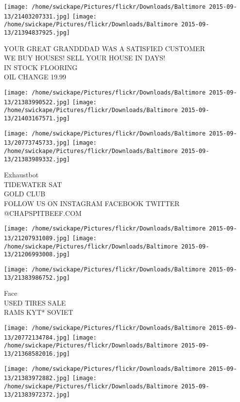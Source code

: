 \documentclass[10pt,letterpaper]{article}
\begin{document}
\texttt{[image: /home/swickape/Pictures/flickr/Downloads/Baltimore 2015-09-13/21403207331.jpg]}
\texttt{[image: /home/swickape/Pictures/flickr/Downloads/Baltimore 2015-09-13/21394837925.jpg]}

YOUR GREAT GRANDDDAD WAS A SATISFIED CUSTOMER\\
WE BUY HOUSES!  SELL YOUR HOUSE IN DAYS!\\
IN STOCK FLOORING\\
OIL CHANGE 19.99\\
\pagebreak

\texttt{[image: /home/swickape/Pictures/flickr/Downloads/Baltimore 2015-09-13/21383990522.jpg]}
\texttt{[image: /home/swickape/Pictures/flickr/Downloads/Baltimore 2015-09-13/21403167571.jpg]}

\texttt{[image: /home/swickape/Pictures/flickr/Downloads/Baltimore 2015-09-13/20773745733.jpg]}
\texttt{[image: /home/swickape/Pictures/flickr/Downloads/Baltimore 2015-09-13/21383989332.jpg]}

Exhaustbot\\
TIDEWATER SAT\\
GOLD CLUB\\
FOLLOW US ON INSTAGRAM FACEBOOK TWITTER @CHAPSPITBEEF.COM\\
\pagebreak

\texttt{[image: /home/swickape/Pictures/flickr/Downloads/Baltimore 2015-09-13/21207931089.jpg]}
\texttt{[image: /home/swickape/Pictures/flickr/Downloads/Baltimore 2015-09-13/21206993008.jpg]}

\vspace{0.25in}
\texttt{[image: /home/swickape/Pictures/flickr/Downloads/Baltimore 2015-09-13/21383986752.jpg]}

Face\\
USED TIRES SALE\\
RAMS KYT* SOVIET\\
\pagebreak

\texttt{[image: /home/swickape/Pictures/flickr/Downloads/Baltimore 2015-09-13/20772134784.jpg]}
\texttt{[image: /home/swickape/Pictures/flickr/Downloads/Baltimore 2015-09-13/21368582016.jpg]}

\texttt{[image: /home/swickape/Pictures/flickr/Downloads/Baltimore 2015-09-13/21383972882.jpg]}
\texttt{[image: /home/swickape/Pictures/flickr/Downloads/Baltimore 2015-09-13/21383972372.jpg]}
\end{document}
